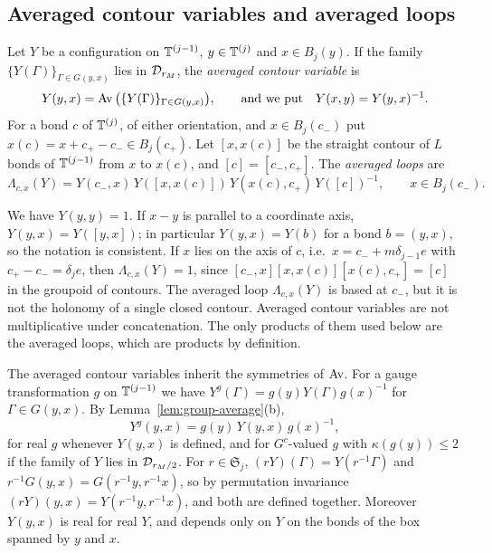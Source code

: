 \subsection{Averaged contour variables and averaged loops}\label{ss:21.4}

\begin{definition}\label{def:avg-contour}
Let $Y$ be a configuration on $\mathbb T^{(j-1)}$, $y\in\mathbb T^{(j)}$ and $x\in B_j(y)$. If the family $\{Y(\Gamma)\}_{\Gamma\in G(y,x)}$ lies in $\mathcal D_{r_M}$, the \emph{averaged contour variable} is
\[
Y(y,x)=\operatorname{Av}\big(\{Y(\Gamma)\}_{\Gamma\in G(y,x)}\big),\qquad\text{and we put}\quad Y(x,y)=Y(y,x)^{-1}.
\]
For a bond $c$ of $\mathbb T^{(j)}$, of either orientation, and $x\in B_j(c_-)$ put $x(c)=x+c_+-c_-\in B_j(c_+)$. Let $[x,x(c)]$ be the straight contour of $L$ bonds of $\mathbb T^{(j-1)}$ from $x$ to $x(c)$, and $[c]=[c_-,c_+]$. The \emph{averaged loops} are
\[
\Lambda_{c,x}(Y)=Y(c_-,x)\,Y([x,x(c)])\,Y(x(c),c_+)\,Y([c])^{-1},\qquad x\in B_j(c_-).
\]
\end{definition}

We have $Y(y,y)=1$. If $x-y$ is parallel to a coordinate axis, $Y(y,x)=Y([y,x])$; in particular $Y(y,x)=Y(b)$ for a bond $b=(y,x)$, so the notation is consistent. If $x$ lies on the axis of $c$, i.e.\ $x=c_-+m\delta_{j-1}e$ with $c_+-c_-=\delta_je$, then $\Lambda_{c,x}(Y)=1$, since $[c_-,x][x,x(c)][x(c),c_+]=[c]$ in the groupoid of contours. The averaged loop $\Lambda_{c,x}(Y)$ is based at $c_-$, but it is not the holonomy of a single closed contour. Averaged contour variables are not multiplicative under concatenation. The only products of them used below are the averaged loops, which are products by definition.

The averaged contour variables inherit the symmetries of $\operatorname{Av}$. For a gauge transformation $g$ on $\mathbb T^{(j-1)}$ we have $Y^g(\Gamma)=g(y)Y(\Gamma)g(x)^{-1}$ for $\Gamma\in G(y,x)$. By Lemma~\ref{lem:group-average}(b),
\begin{equation}\label{eq:avg-contour-gauge}
Y^g(y,x)=g(y)\,Y(y,x)\,g(x)^{-1},
\end{equation}
for real $g$ whenever $Y(y,x)$ is defined, and for $G^c$-valued $g$ with $\kappa(g(y))\le2$ if the family of $Y$ lies in $\mathcal D_{r_M/2}$. For $r\in\mathfrak S_j$, $(rY)(\Gamma)=Y(r^{-1}\Gamma)$ and $r^{-1}G(y,x)=G(r^{-1}y,r^{-1}x)$, so by permutation invariance $(rY)(y,x)=Y(r^{-1}y,r^{-1}x)$, and both are defined together. Moreover $Y(y,x)$ is real for real $Y$, and depends only on $Y$ on the bonds of the box spanned by $y$ and $x$.

